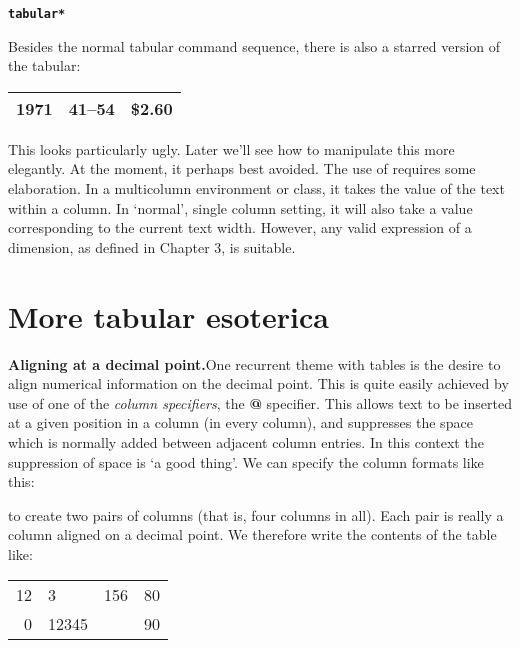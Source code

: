 \begin{multicols}{2}
\texttt{\bf tabular*}

Besides the normal tabular command sequence, there is also a 
starred version of the tabular:

\begin{tabular*}{\linewidth}{|r|c|c|}
\hline
1971 & 41--54 & \$2.60 \\
\hline
\end{tabular*}
\bigskip

This looks particularly ugly. Later we'll see how to manipulate
this more elegantly. At the moment, it perhaps best
avoided. The use of  requires some elaboration.
In a multicolumn environment or class, it takes the value of
the text within a column. In ‘normal’, single column setting,
it will also take a value corresponding to the current text
width. However, any valid expression of a dimension, as defined
in Chapter 3, is suitable.



\section{More tabular esoterica}

\textbf{Aligning at a decimal point.}\quad One recurrent theme with tables is the desire to align numerical
information on the decimal point. This is quite easily
achieved by use of one of the \textit{column specifiers}, the \textbf{@} specifier.
This allows text to be inserted at a given position in a
column (in every column), and suppresses the space which
is normally added between adjacent column entries. In this
context the suppression of space is `a good thing'. We can
specify the column formats like this:




to create two pairs of columns (that is, four columns in all).
Each pair is really a column aligned on a decimal point. We
therefore write the contents of the table like:

\begin{Code}
\begin{tabular}{r@{.}lr@{.}l}
\toprule
12  &3         & 156 &80 \\
0    &12345  &       &90 \\
\bottomrule
\end{tabular}
\end{Code}


\end{multicols}
